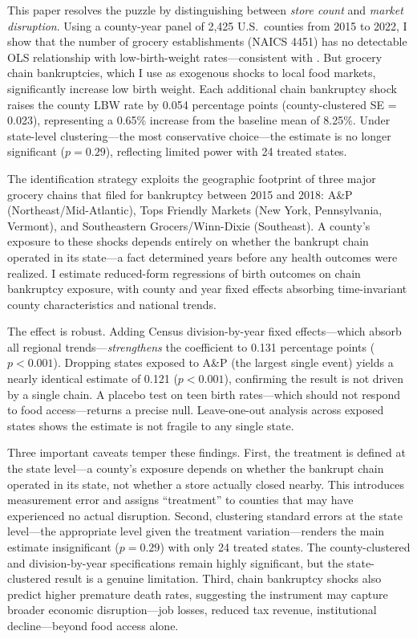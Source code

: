 \documentclass[12pt]{article}
\begin{document}
This paper resolves the puzzle by distinguishing between \textit{store count} and \textit{market disruption}. Using a county-year panel of 2,425 U.S.\ counties from 2015 to 2022, I show that the number of grocery establishments (NAICS 4451) has no detectable OLS relationship with low-birth-weight rates---consistent with \citet{allcott2019food}. But grocery chain bankruptcies, which I use as exogenous shocks to local food markets, significantly increase low birth weight. Each additional chain bankruptcy shock raises the county LBW rate by 0.054 percentage points (county-clustered SE = 0.023), representing a 0.65\% increase from the baseline mean of 8.25\%. Under state-level clustering---the most conservative choice---the estimate is no longer significant ($p = 0.29$), reflecting limited power with 24 treated states.

The identification strategy exploits the geographic footprint of three major grocery chains that filed for bankruptcy between 2015 and 2018: A\&P (Northeast/Mid-Atlantic), Tops Friendly Markets (New York, Pennsylvania, Vermont), and Southeastern Grocers/Winn-Dixie (Southeast). A county's exposure to these shocks depends entirely on whether the bankrupt chain operated in its state---a fact determined years before any health outcomes were realized. I estimate reduced-form regressions of birth outcomes on chain bankruptcy exposure, with county and year fixed effects absorbing time-invariant county characteristics and national trends.

The effect is robust. Adding Census division-by-year fixed effects---which absorb all regional trends---\textit{strengthens} the coefficient to 0.131 percentage points ($p < 0.001$). Dropping states exposed to A\&P (the largest single event) yields a nearly identical estimate of 0.121 ($p < 0.001$), confirming the result is not driven by a single chain. A placebo test on teen birth rates---which should not respond to food access---returns a precise null. Leave-one-out analysis across exposed states shows the estimate is not fragile to any single state.

Three important caveats temper these findings. First, the treatment is defined at the state level---a county's exposure depends on whether the bankrupt chain operated in its state, not whether a store actually closed nearby. This introduces measurement error and assigns ``treatment'' to counties that may have experienced no actual disruption. Second, clustering standard errors at the state level---the appropriate level given the treatment variation---renders the main estimate insignificant ($p = 0.29$) with only 24 treated states. The county-clustered and division-by-year specifications remain highly significant, but the state-clustered result is a genuine limitation. Third, chain bankruptcy shocks also predict higher premature death rates, suggesting the instrument may capture broader economic disruption---job losses, reduced tax revenue, institutional decline---beyond food access alone.
\end{document}
